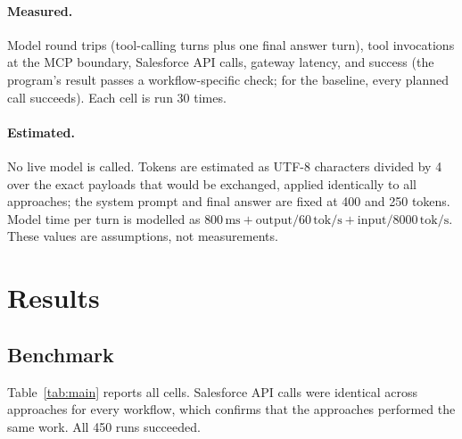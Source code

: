 \documentclass[11pt]{article}
\begin{document}
\paragraph{Measured.} Model round trips (tool-calling turns plus one final answer turn), tool invocations at the MCP boundary, Salesforce API calls, gateway latency, and success (the program's result passes a workflow-specific check; for the baseline, every planned call succeeds). Each cell is run 30 times.
\paragraph{Estimated.} No live model is called. Tokens are estimated as UTF-8 characters divided by 4 over the exact payloads that would be exchanged, applied identically to all approaches; the system prompt and final answer are fixed at 400 and 250 tokens. Model time per turn is modelled as $800\,\text{ms} + \text{output}/60\,\text{tok/s} + \text{input}/8000\,\text{tok/s}$. These values are assumptions, not measurements.

\section{Results}\label{sec:results}
\subsection{Benchmark}
Table~\ref{tab:main} reports all cells. Salesforce API calls were identical across approaches for every workflow, which confirms that the approaches performed the same work. All 450 runs succeeded.
\end{document}
